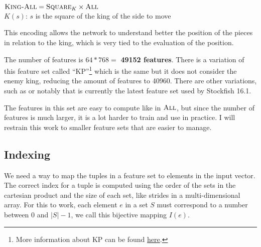 \begin{center}
    $\textsc{King-All} = \textsc{Square}_{K} \times \textsc{All}$ \\
    $K(s)$: $s$ is the square of the king of the side to move\\
\end{center}

This encoding allows the network to understand better the position of the pieces in relation to the king, which is very tied to the evaluation of the position.

The number of features is $64*768=$ \textbf{49152 features}. There is a variation of this feature set called \enquote{KP}\footnote{More information about KP can be found \href{https://www.chessprogramming.org/Stockfish_NNUE\#HalfKP}{here}.} which is the same but it does not consider the enemy king, reducing the amount of features to 40960. There are other variations, such as  or notably  that is currently the latest feature set used by Stockfish 16.1.

The features in this set are easy to compute like in $\textsc{All}$, but since the number of features is much larger, it is a lot harder to train and use in practice. I will restrain this work to smaller feature sets that are easier to manage.

\newpage
\subsection{Indexing}


We need a way to map the tuples in a feature set to elements in the input vector. The correct index for a tuple is computed using the order of the sets in the cartesian product and the size of each set, like strides in a multi-dimensional array. For this to work, each element $e$ in a set $S$ must correspond to a number between $0$ and $|S| - 1$, we call this bijective mapping $I(e)$.

